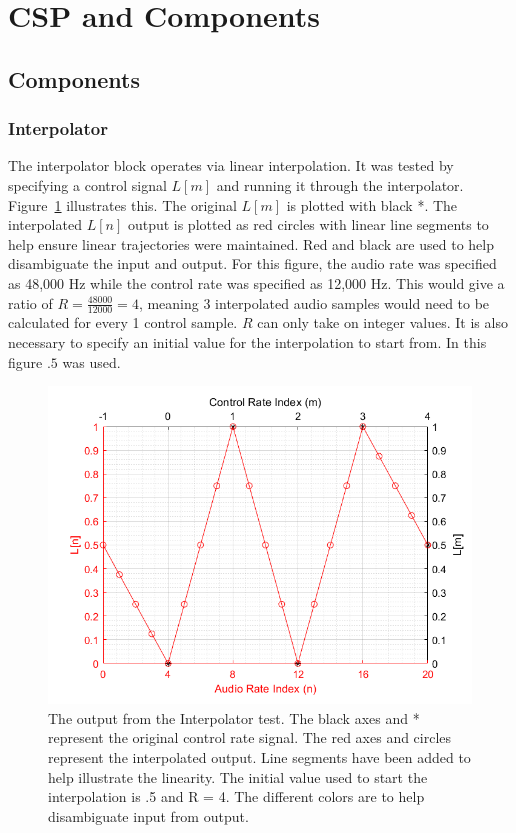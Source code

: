 \documentclass[../main.tex]{subfiles}
\begin{document}
\section{CSP and Components}
\subsection{Components}
\subsubsection{Interpolator}
The interpolator block operates via linear interpolation.  It was tested by specifying a control signal $L[m]$ and running it through the interpolator. Figure~\ref{fig:InterpTest} illustrates this. The original $L[m]$ is plotted with black *. The interpolated $L[n]$ output is plotted as red circles with linear line segments to help ensure linear trajectories were maintained. Red and black are used to help disambiguate the input and output. For this figure, the audio rate was specified as 48,000 Hz while the control rate was specified as 12,000 Hz. This would give a ratio of $R = \frac{48000}{12000} = 4$, meaning 3 interpolated audio samples would need to be calculated for every 1 control sample. $R$ can only take on integer values. It is also necessary to specify an initial value for the interpolation to start from. In this figure $.5$ was used.

\begin{figure}[h]
    \centering
    \includegraphics[scale=.65]{./images/plots/InterpolatorTest.png}
    \caption{The output from the Interpolator test. The black axes and * represent the original control rate signal. The red axes and circles represent the interpolated output. Line segments have been added to help illustrate the linearity. The initial value used to start the interpolation is .5 and R = 4. The different colors are to help disambiguate input from output.}
    \label{fig:InterpTest}
\end{figure}
\end{document}
